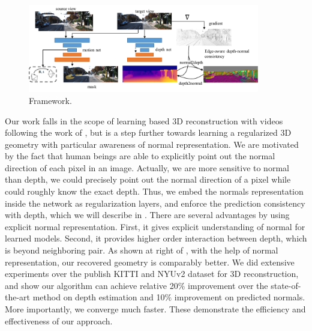 \begin{figure}[t]
\centering
\includegraphics[width=0.9\textwidth]{figures/pipeline.pdf}
\caption{Framework.}
\label{fig:pipeline}
\end{figure}
Our work falls in the scope of learning based 3D reconstruction with videos following the work of \cite{zhou2017unsupervised}, but is a step further towards learning a regularized 3D geometry with particular awareness of normal representation. 
We are motivated by the fact that human beings are able to explicitly point out the normal direction of each pixel in an image. Actually, we are more sensitive to normal than depth, \eg we could precisely point out the normal direction of a pixel while could roughly know the exact depth. 
Thus, we embed the normals representation inside the network as regularization layers, and enforce the prediction consistency with depth, which we will describe in .
There are several advantages by using explicit normal representation. First, it gives explicit understanding of normal for learned models.  Second, it provides higher order interaction between depth, which is beyond neighboring pair. 
As shown at right of , with the help of normal representation, our recovered geometry is comparably better. We did extensive experiments over the publish KITTI and NYUv2 dataset for 3D reconstruction, and show our algorithm can achieve relative 20$\%$ improvement over the state-of-the-art method on depth estimation and 10$\%$ improvement on predicted normals. More importantly, we converge much faster. These demonstrate the efficiency and effectiveness of our approach.




